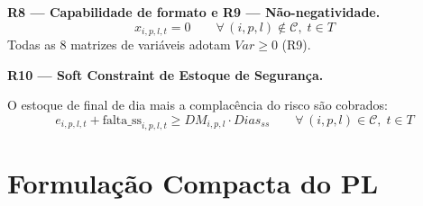 \documentclass[12pt, a4paper]{article}
\begin{document}
\vspace{8pt}

\begin{mdframed}[style=destaque]
\textbf{\color{ballblue}R8 --- Capabilidade de formato e R9 --- N\~{a}o-negatividade.}
\[
  x_{i,p,l,t} = 0 \qquad \forall\, (i,p,l) \notin \mathcal{C},\; t \in T \tag{R8}
\]
Todas as 8 matrizes de vari\'{a}veis adotam $Var \geq 0$ (R9).
\end{mdframed}

\vspace{8pt}

\begin{mdframed}[style=destaque]
\textbf{\color{ballblue}R10 --- Soft Constraint de Estoque de Seguran\c{c}a.}
\medskip

O estoque de final de dia mais a complac\^{e}ncia do risco s\~{a}o cobrados:
\[
  e_{i,p,l,t} + \text{falta\_ss}_{i,p,l,t} \geq DM_{i,p,l} \cdot Dias_{ss} \qquad \forall\, (i,p,l) \in \mathcal{C},\; t \in T
\]
\end{mdframed}

\newpage
\section{Formula\c{c}\~{a}o Compacta do PL}
\end{document}
